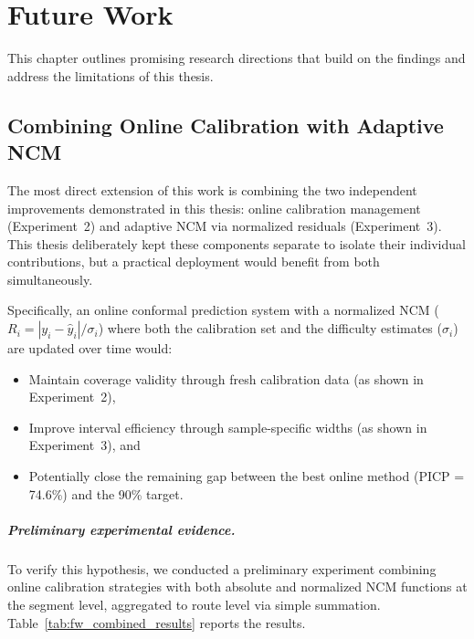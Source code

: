 
\chapter{Future Work}
\label{ch:future_work}

This chapter outlines promising research directions that build on the findings and address the limitations of this thesis.


\section{Combining Online Calibration with Adaptive NCM}
\label{sec:fw_combined}

The most direct extension of this work is combining the two independent improvements demonstrated in this thesis: online calibration management (Experiment~2) and adaptive NCM via normalized residuals (Experiment~3). This thesis deliberately kept these components separate to isolate their individual contributions, but a practical deployment would benefit from both simultaneously.

Specifically, an online conformal prediction system with a normalized NCM ($R_i = |y_i - \hat{y}_i| / \sigma_i$) where both the calibration set and the difficulty estimates ($\sigma_i$) are updated over time would:
\begin{itemize}
    \item Maintain coverage validity through fresh calibration data (as shown in Experiment~2),
    \item Improve interval efficiency through sample-specific widths (as shown in Experiment~3), and
    \item Potentially close the remaining gap between the best online method (PICP = 74.6\%) and the 90\% target.
\end{itemize}

\paragraph{Preliminary experimental evidence.} To verify this hypothesis, we conducted a preliminary experiment combining online calibration strategies with both absolute and normalized NCM functions at the segment level, aggregated to route level via simple summation. Table~\ref{tab:fw_combined_results} reports the results.

